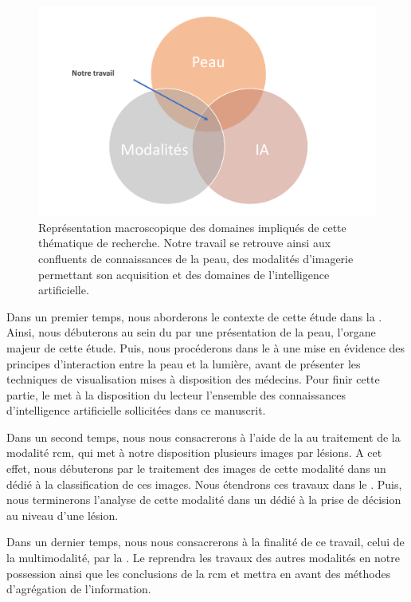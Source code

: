 \begin{figure}[H]
    \centering
    \includegraphics[width=0.8\linewidth]{contents/i_introduction/resources/scheme_our_work.pdf}
    \caption{Représentation macroscopique des domaines impliqués de cette thématique de recherche. Notre travail se retrouve ainsi aux confluents de connaissances de la peau, des modalités d'imagerie permettant son acquisition et des domaines de l'intelligence artificielle.}
    \label{fig:scheme_our_work}
\end{figure}\par

Dans un premier temps, nous aborderons le contexte de cette étude dans la . Ainsi, nous débuterons au sein du  par une présentation de la peau, l'organe majeur de cette étude. Puis, nous procéderons dans le  à une mise en évidence des principes d'interaction entre la peau et la lumière, avant de présenter les techniques de visualisation mises à disposition des médecins. Pour finir cette partie, le  met à la disposition du lecteur l'ensemble des connaissances d'intelligence artificielle sollicitées dans ce manuscrit.\par

Dans un second temps, nous nous consacrerons à l'aide de la  au traitement de la modalité \gls{rcm}, qui met à notre disposition plusieurs images par lésions. A cet effet, nous débuterons par le traitement des images de cette modalité dans un  dédié à la classification de ces images. Nous étendrons ces travaux dans le . Puis, nous terminerons l'analyse de cette modalité dans un  dédié à la prise de décision au niveau d'une lésion.\par

Dans un dernier temps, nous nous consacrerons à la finalité de ce travail, celui de la multimodalité, par la . Le  reprendra les travaux des autres modalités en notre possession ainsi que les conclusions de la \gls{rcm} et mettra en avant des méthodes d'agrégation de l'information.\par